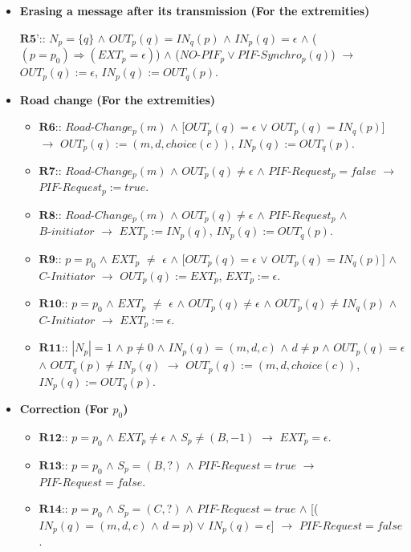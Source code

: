 \documentclass{llncs}
\begin{document}
\begin{algorithm}[htb]
\begin{scriptsize}
\begin{itemize}
         \item{\textbf{Erasing a message after its transmission (For the extremities) }}

$\textbf{R5'}$:: $N_{p}=\{q\}$ $\wedge$ $OUT_{p}(q)=IN_{q}(p)$ $\wedge$ $IN_{p}(q)=\epsilon$ $\wedge$
		($(p=p_0) \Rightarrow (EXT_p=\epsilon)$) 
		$\wedge$ ($NO\mbox{-}PIF_{p} \vee PIF\mbox{-}Synchro_{p}(q)$)   $\rightarrow$ $OUT_{p}(q):=\epsilon$, $IN_{p}(q):=OUT_{q}(p)$.\\
             
\item{\textbf{Road change (For the extremities) }}\begin{itemize}
               \item{$\textbf{R6}$:: $Road\mbox{-}Change_{p}(m)$ $\wedge$ [$OUT_{p}(q)=\epsilon$ $\vee$ $OUT_{p}(q)=IN_{q}(p)$] $\rightarrow$ $OUT_{p}(q):=(m,d,choice(c))$, $IN_{p}(q):=OUT_{q}(p)$.}
               \item{$\textbf{R7}$:: $Road\mbox{-}Change_{p}(m)$ $\wedge$ $OUT_{p}(q) \ne \epsilon$ $\wedge$ $PIF\mbox{-}Request_{p}=false$ $\rightarrow$ $PIF\mbox{-}Request_{p}:=true$. }
               \item{$\textbf{R8}$:: $Road\mbox{-}Change_{p}(m)$ $\wedge$ $OUT_{p}(q) \ne \epsilon$ $\wedge$ $PIF\mbox{-}Request_{p}$ $\wedge$ $B\mbox{-}initiator$ $\rightarrow$ $EXT_{p}:=IN_{p}(q)$, $IN_{p}(q):=OUT_{q}(p)$.}
               \item{$\textbf{R9}$:: $p=p_0$ $\wedge$ $EXT_{p}$ $\ne$ $\epsilon$ $\wedge$ [$OUT_{p}(q)=\epsilon$ $\vee$ $OUT_{p}(q)=IN_{q}(p)$] $\wedge$ $C\mbox{-}Initiator$ $\rightarrow$  $OUT_{p}(q):=EXT_{p}$, $EXT_{p}:=\epsilon$.}
               \item{$\textbf{R10}$:: $p=p_0$ $\wedge$ $EXT_{p}$ $\ne$ $\epsilon$ $\wedge$ $OUT_{p}(q) \ne \epsilon$ $\wedge$ $OUT_{p}(q) \ne IN_{q}(p)$ $\wedge$ $C\mbox{-}Initiator$ $\rightarrow$  $EXT_{p}:=\epsilon$.}
               \item{$\textbf{R11}$:: $|N_{p}|=1$ $\wedge$ $p\ne 0$ $\wedge$ $IN_{p}(q)=(m,d,c)$ $\wedge$ $d \ne p$  $\wedge$ $OUT_{p}(q)=\epsilon$ $\wedge$ $OUT_{q}(p)\ne IN_{p}(q)$ $\rightarrow$ $OUT_{p}(q):=(m,d,choice(c))$, $IN_{p}(q):=OUT_{q}(p)$.}\\
           \end{itemize}
       \item{\textbf{Correction  (For $p_0$) }}\begin{itemize}
             \item{$\textbf{R12}$:: $p=p_0$ $\wedge$ $EXT_{p} \ne \epsilon$ $\wedge$ $S_{p}\ne (B,-1)$ $\rightarrow$ $EXT_{p}=\epsilon$.}
             \item{$\textbf{R13}$:: $p=p_0$ $\wedge$ $S_{p}=(B,?)$ $\wedge$ $PIF\mbox{-}Request=true$ $\rightarrow$ $PIF\mbox{-}Request=false$.}
             \item{$\textbf{R14}$:: $p=p_0$ $\wedge$ $S_{p}=(C,?)$ $\wedge$ $PIF\mbox{-}Request=true$ $\wedge$ [($IN_{p}(q)=(m,d,c)$ $\wedge$ $d=p$) $\vee$ $IN_{p}(q)=\epsilon$] $\rightarrow$ $PIF\mbox{-}Request=false$.}
            \end{itemize}       
       

\end{itemize}
\end{scriptsize}
\end{algorithm}
\end{document}

